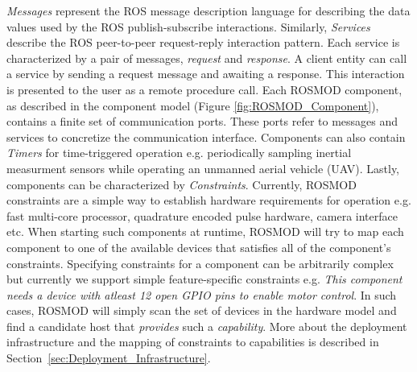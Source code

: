 \emph{Messages} represent the ROS message description language for
describing the data values used by the ROS publish-subscribe
interactions. Similarly, \emph{Services} describe the ROS peer-to-peer
request-reply interaction pattern. Each service is characterized by a
pair of messages, \emph{request} and \emph{response}. A client entity
can call a service by sending a request message and awaiting a
response. This interaction is presented to the user as a remote
procedure call. Each ROSMOD component, as described in the component
model (Figure \ref{fig:ROSMOD_Component}), contains a finite set of
communication ports. These ports refer to messages and services to
concretize the communication interface. Components can also contain
\emph{Timers} for time-triggered operation e.g. periodically sampling
inertial measurment sensors while operating an unmanned aerial vehicle
(UAV). Lastly, components can be characterized by
\emph{Constraints}. Currently, ROSMOD constraints are a simple way to
establish hardware requirements for operation e.g. fast multi-core
processor, quadrature encoded pulse hardware, camera interface
etc. When starting such components at runtime, ROSMOD will try to map
each component to one of the available devices that satisfies all of
the component's constraints. Specifying constraints for a component
can be arbitrarily complex but currently we support simple
feature-specific constraints e.g. \emph{This component needs a device
	with atleast 12 open GPIO pins to enable motor control}. In such
cases, ROSMOD will simply scan the set of devices in the hardware
model and find a candidate host that \emph{provides} such a
\emph{capability}.  More about the deployment infrastructure and the
mapping of constraints to capabilities is described in
Section~\ref{sec:Deployment_Infrastructure}.

